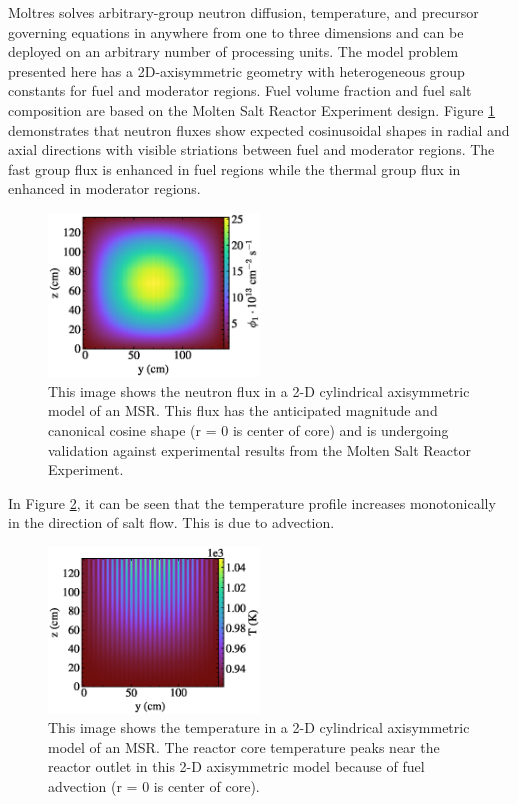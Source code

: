 \documentclass[letterpaper]{article}
\begin{document}
Moltres solves arbitrary-group neutron diffusion, temperature, and precursor
governing equations in anywhere from one to three dimensions and can be
deployed on an arbitrary number of processing units. The model problem
presented here has a 2D-axisymmetric geometry with heterogeneous group
constants for fuel and moderator regions. Fuel volume fraction and fuel salt
composition are based on the Molten Salt Reactor Experiment design. Figure 
\ref{fig:flux} demonstrates that neutron
fluxes show expected cosinusoidal shapes in radial and axial directions with
visible striations between fuel and moderator regions. The fast group flux is
enhanced in fuel regions while the thermal group flux in enhanced in moderator
regions. 

\begin{figure}[htb]
        \begin{center}
                \includegraphics[width=0.5\textwidth]{flux.eps}
        \end{center}
        \caption{This image shows the neutron flux in a 2-D cylindrical axisymmetric model of an MSR. This flux has the anticipated magnitude and canonical cosine shape (r = 0 is center of core) and is undergoing validation against experimental results from the Molten Salt Reactor Experiment.}
        \label{fig:flux}
\end{figure}

In Figure \ref{fig:temp}, it can be seen that the temperature profile increases monotonically in
the direction of salt flow. This is due to advection. 

\begin{figure}[htb]
        \begin{center}
                \includegraphics[width=0.5\textwidth]{temp.eps}
        \end{center}
        \caption{This image shows the temperature in a 2-D cylindrical axisymmetric model of an MSR. The reactor core temperature peaks near the reactor outlet in this 2-D axisymmetric model because of fuel advection (r = 0 is center of core).} 
        \label{fig:temp}
\end{figure}
\end{document}
